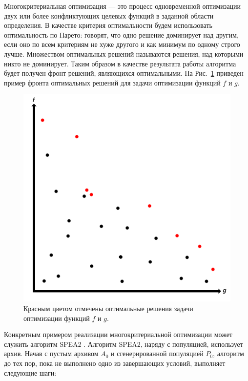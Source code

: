 \documentclass[12pt,fleqn]{article}
\begin{document}
Многокритериальная оптимизация --- это процесс одновременной оптимизации двух или более конфликтующих целевых функций
в заданной области определения. В качестве критерия оптимальности будем использовать оптимальность по Парето:
говорят, что одно решение доминирует над другим, если оно по всем критериям не хуже другого и как минимум по одному
строго лучше. Множеством оптимальных решений называются решения, над которыми никто не доминирует. Таким образом
в качестве результата работы алгоритма будет получен фронт решений, являющихся оптимальными. На Рис.~\ref{opt}
приведен пример фронта оптимальных решений для задачи оптимизации функций $f$ и $g$.

\FloatBarrier

\begin{figure}[!h]
  \centering
    \includegraphics[scale=0.3]{opt.png}
  \caption{Красным цветом отмечены оптимальные решения задачи оптимизации функций $f$ и $g$.}
  \label{opt}
\end{figure}

\FloatBarrier

Конкретным примером реализации многокритериальной оптимизации может служить алгоритм SPEA2 \cite{spea2}. Алгоритм SPEA2,
наряду с популяцией, использует архив. Начав с пустым архивом $A_0$ и сгенерированной популяцией $P_0$, алгоритм до
тех пор, пока не выполнено одно из завершающих условий, выполняет следующие шаги: 
\end{document}
